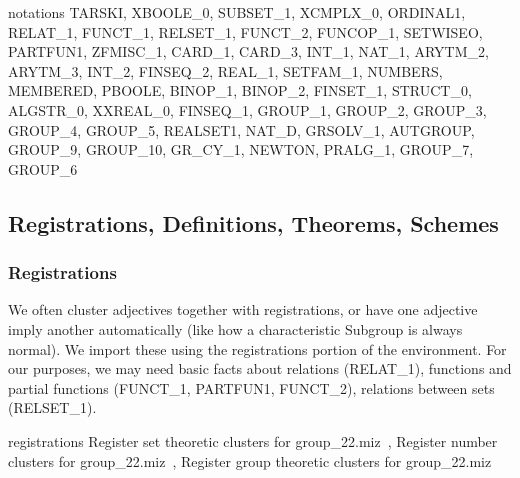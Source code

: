 \nwenddocs{}\endmoddef\nwstartdeflinemarkup{}\nwenddeflinemarkup
notations TARSKI, XBOOLE_0, SUBSET_1, XCMPLX_0, ORDINAL1, RELAT_1,
  FUNCT_1, RELSET_1, FUNCT_2, FUNCOP_1, SETWISEO, PARTFUN1,
  ZFMISC_1, CARD_1, CARD_3, INT_1, NAT_1, ARYTM_2, ARYTM_3, INT_2,
  FINSEQ_2, REAL_1, SETFAM_1, NUMBERS, MEMBERED, PBOOLE, BINOP_1,
  BINOP_2, FINSET_1, STRUCT_0, ALGSTR_0, XXREAL_0, FINSEQ_1, GROUP_1, GROUP_2,
  GROUP_3, GROUP_4, GROUP_5, REALSET1, NAT_D, GRSOLV_1,
  AUTGROUP, GROUP_9, GROUP_10, GR_CY_1, NEWTON, PRALG_1, GROUP_7, GROUP_6
\nwendcode{}\nwdocspar

\subsection{Registrations, Definitions, Theorems, Schemes}

\subsubsection{Registrations}
We often cluster adjectives together with registrations, or have one
adjective imply another automatically (like how a characteristic
Subgroup is always normal). We import these using the registrations
portion of the environment. For our purposes, we may need basic facts
about relations ({\Tt{}RELAT{\_}1\nwendquote}), functions and partial functions ({\Tt{}FUNCT{\_}1\nwendquote},
{\Tt{}PARTFUN1\nwendquote}, {\Tt{}FUNCT{\_}2\nwendquote}), relations between sets ({\Tt{}RELSET{\_}1\nwendquote}).

\nwenddocs{}\endmoddef\nwstartdeflinemarkup{}\nwenddeflinemarkup
registrations \LA{}Register set theoretic clusters for \code{}group{\_}22.miz\edoc{}~{\nwtagstyle{}}\RA{},
  \LA{}Register number clusters for \code{}group{\_}22.miz\edoc{}~{\nwtagstyle{}}\RA{},
  \LA{}Register group theoretic clusters for \code{}group{\_}22.miz\edoc{}~{\nwtagstyle{}}\RA{}
\nwendcode{}\nwdocspar

